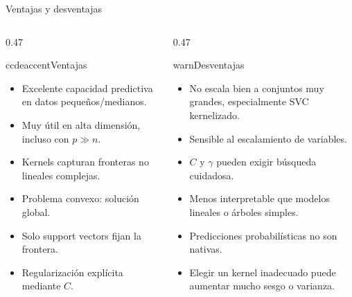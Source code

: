 \begin{frame}{Ventajas y desventajas}
\footnotesize
\begin{columns}[T,onlytextwidth]
\begin{column}{0.47\textwidth}
\begin{contrastbox}{ccdeaccent}{Ventajas}
\footnotesize
\begin{itemize}
  \item Excelente capacidad predictiva en datos pequeños/medianos.
  \item Muy útil en alta dimensión, incluso con $p\gg n$.
  \item Kernels capturan fronteras no lineales complejas.
  \item Problema convexo: solución global.
  \item Solo support vectors fijan la frontera.
  \item Regularización explícita mediante $C$.
\end{itemize}
\end{contrastbox}
\end{column}
\begin{column}{0.47\textwidth}
\begin{contrastbox}{warn}{Desventajas}
\footnotesize
\begin{itemize}
  \item No escala bien a conjuntos muy grandes, especialmente SVC kernelizado.
  \item Sensible al escalamiento de variables.
  \item $C$ y $\gamma$ pueden exigir búsqueda cuidadosa.
  \item Menos interpretable que modelos lineales o árboles simples.
  \item Predicciones probabilísticas no son nativas.
  \item Elegir un kernel inadecuado puede aumentar mucho sesgo o varianza.
\end{itemize}
\end{contrastbox}
\end{column}
\end{columns}
\end{frame}

